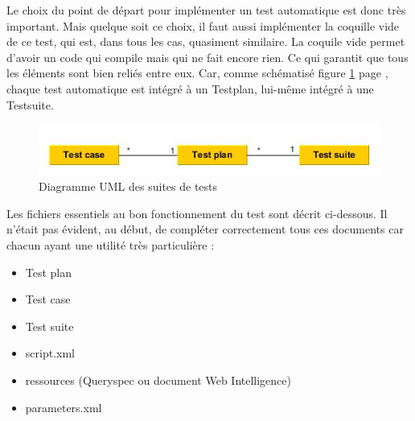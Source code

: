 Le choix du point de d\'{e}part pour impl\'{e}menter un test automatique est donc tr\`{e}s important. Mais quelque soit ce choix, il faut aussi impl\'{e}menter la coquille vide de ce test, qui est, dans tous les cas, quasiment similaire. La coquile vide permet d'avoir un code qui compile mais qui ne fait encore rien. Ce qui garantit que tous les \'{e}l\'{e}ments sont bien reli\'{e}s entre eux. Car, comme sch\'{e}matis\'{e} figure \ref{figure:testsRelations} page \pageref{figure:testsRelations}, chaque test automatique est int\'{e}gr\'{e} \`{a} un \gls{Testplan}, lui-m\^{e}me int\'{e}gr\'{e} \`{a} une \gls{Testsuite}.\\
\begin{figure}[!ht]
  \centering
      \includegraphics[width=\textwidth]{images/testsRelations.jpg}
  \caption{Diagramme UML des suites de tests}
	\label{figure:testsRelations}
\end{figure}

Les fichiers essentiels au bon fonctionnement du test sont d\'{e}crit ci-dessous. Il n'\'{e}tait pas \'{e}vident, au d\'{e}but, de compl\'{e}ter correctement tous ces documents car chacun ayant une utilit\'{e} tr\`{e}s particuli\`{e}re :
\begin{itemize}
	\item Test plan
	\item Test case
	\item Test suite
	\item script.xml
	\item ressources (\gls{Queryspec} ou document Web Intelligence)
	\item parameters.xml
\end{itemize}

